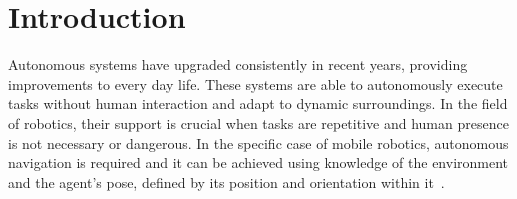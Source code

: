 

\chapter{Introduction}
\label{ch:introduction}









\noindent
Autonomous systems have upgraded consistently in recent years, providing improvements to every day life.
These systems are able to autonomously execute tasks without human interaction and adapt to dynamic surroundings.
In the field of robotics, their support is crucial when tasks are repetitive and human presence is not necessary or dangerous.
In the specific case of mobile robotics, autonomous navigation is required and it can be achieved using knowledge of the environment and the agent's pose, defined by its position and orientation within it~\cite{4140744}.

